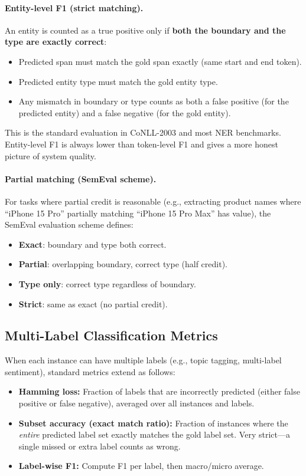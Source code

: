 \paragraph{Entity-level F1 (strict matching).}
An entity is counted as a true positive only if \textbf{both the boundary and
the type are exactly correct}:
\begin{itemize}
    \item Predicted span must match the gold span exactly (same start and end
          token).
    \item Predicted entity type must match the gold entity type.
    \item Any mismatch in boundary or type counts as both a false positive
          (for the predicted entity) and a false negative (for the gold entity).
\end{itemize}

This is the standard evaluation in CoNLL-2003 and most NER benchmarks.  Entity-level
F1 is always lower than token-level F1 and gives a more honest picture of system
quality.

\paragraph{Partial matching (SemEval scheme).}
For tasks where partial credit is reasonable (e.g., extracting product names
where ``iPhone 15 Pro'' partially matching ``iPhone 15 Pro Max'' has value), the
SemEval evaluation scheme defines:
\begin{itemize}
    \item \textbf{Exact}: boundary and type both correct.
    \item \textbf{Partial}: overlapping boundary, correct type (half credit).
    \item \textbf{Type only}: correct type regardless of boundary.
    \item \textbf{Strict}: same as exact (no partial credit).
\end{itemize}

\subsection{Multi-Label Classification Metrics}

When each instance can have multiple labels (e.g., topic tagging, multi-label
sentiment), standard metrics extend as follows:
\begin{itemize}
    \item \textbf{Hamming loss:} Fraction of labels that are incorrectly
          predicted (either false positive or false negative), averaged over all
          instances and labels.
    \item \textbf{Subset accuracy (exact match ratio):} Fraction of instances
          where the \emph{entire} predicted label set exactly matches the gold
          label set.  Very strict---a single missed or extra label counts as
          wrong.
    \item \textbf{Label-wise F1:} Compute F1 per label, then macro/micro
          average.
\end{itemize}

